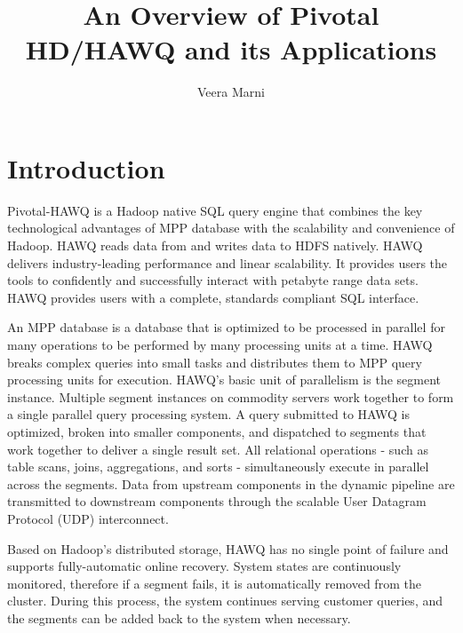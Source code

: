 \documentclass[9pt,twocolumn,twoside]{../../styles/osajnl}
\title{An Overview of Pivotal HD/HAWQ and its Applications}
\author[1]{Veera Marni}
\affil[1]{School of Informatics and Computing, Bloomington, IN 47408, U.S.A.}
\affil[*]{Corresponding authors: vmarni@umail.iu.edu}
\begin{document}
\maketitle
{}
\section{Introduction}

{Pivotal-HAWQ}\cite{www-about-hawq} is a Hadoop native SQL query
engine that
combines the key technological advantages of MPP database with the
scalability and convenience of Hadoop. HAWQ reads data from and
writes data to HDFS natively. HAWQ delivers industry-leading
performance and linear scalability. It provides users the tools to
confidently and successfully interact with petabyte range data sets.
HAWQ provides users with a complete, standards compliant SQL
interface.

{An MPP database is a database that is optimized to be processed in
parallel for many operations to	be performed by many processing units
at a time.}\cite{www-about-mpp} HAWQ breaks complex queries into
small tasks and distributes them to MPP query processing units for
execution. HAWQ’s basic unit of parallelism is the segment instance.
Multiple segment instances on commodity servers work together to form
a single parallel query processing system. A query submitted to HAWQ
is optimized, broken into smaller components, and dispatched to
segments that work together to deliver a single result set. All
relational operations - such as table scans, joins, aggregations, and
sorts - simultaneously execute in parallel across the segments. Data
from upstream components in the dynamic pipeline are transmitted to
downstream components through the scalable User Datagram Protocol
(UDP) \CE interconnect.

Based on Hadoop’s distributed storage, HAWQ has no single point of
failure and supports fully-automatic online recovery. System states
are continuously monitored, therefore if a segment fails, it is
automatically removed from the cluster. During this process, the
system continues serving customer queries, and the segments can be
added back to the system when necessary.
\end{document}
